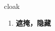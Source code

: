 
\begin{frame}
{\huge cloak}
\begin{center}
\begin{enumerate}\Large
  \item \textbf{遮掩，隐藏}
\end{enumerate}
\end{center}
\end{frame}
